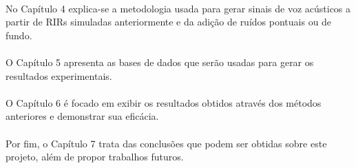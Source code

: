 \paragraph{}No Capítulo 4 explica-se a metodologia usada para gerar sinais de voz acústicos a partir de RIRs simuladas anteriormente e da adição
de ruídos pontuais ou de fundo.

\paragraph{}O Capítulo 5 apresenta as bases de dados que serão usadas para gerar os resultados experimentais.

\paragraph{}O Capítulo 6 é focado em exibir os resultados obtidos através dos métodos anteriores e demonstrar sua eficácia.

\paragraph{}Por fim, o Capítulo 7 trata das conclusões que podem ser obtidas sobre este projeto, além de propor trabalhos futuros.
